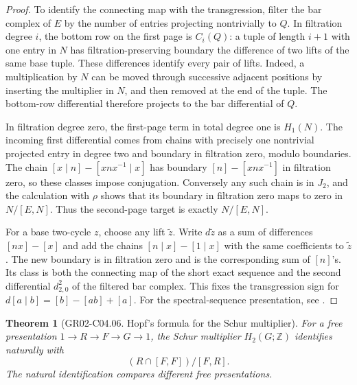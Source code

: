 \documentclass[11pt,oneside,openany]{book}
\newtheorem{theorem}{Theorem}[chapter]
\theoremstyle{definition}
\theoremstyle{remark}
\begin{document}
\begin{proof}
To identify the connecting map with the transgression, filter the
bar complex of \(E\) by the number of entries projecting
nontrivially to \(Q\). In filtration degree \(i\), the bottom row
on the first page is \(C_i(Q)\): a tuple of length \(i+1\) with
one entry in \(N\) has filtration-preserving boundary the
difference of two lifts of the same base tuple. These differences
identify every pair of lifts. Indeed, a multiplication by \(N\)
can be moved through successive adjacent positions by inserting
the multiplier in \(N\), and then removed at the end of the
tuple. The bottom-row differential therefore projects to the bar
differential of \(Q\).

In filtration degree zero, the first-page term in total degree one
is \(H_1(N)\). The incoming first differential comes from
chains with precisely one nontrivial projected entry in degree
two and boundary in filtration zero, modulo boundaries.
The chain \([x\mid n]-[xnx^{-1}\mid x]\) has boundary
\([n]-[xnx^{-1}]\) in filtration zero, so these classes impose
conjugation. Conversely any such chain is in \(J_2\), and the
calculation with \(\rho\) shows that its boundary in filtration
zero maps to zero in \(N/[E,N]\). Thus the second-page target
is exactly \(N/[E,N]\).

For a base two-cycle \(z\), choose any lift \(\widetilde z\).
Write \(d\widetilde z\) as a sum of differences \([nx]-[x]\) and
add the chains \([n\mid x]-[1\mid x]\) with the same coefficients
to \(\widetilde z\). The new boundary is in filtration zero and
is the corresponding sum of \([n]\)'s. Its class is both the
connecting map of the short exact sequence and the second
differential \(d^2_{2,0}\) of the filtered bar complex. This fixes
the transgression sign for \(d[a\mid b]=[b]-[ab]+[a]\).
For the spectral-sequence presentation, see \cite[Section 6.8.3]{weibel}.
\end{proof}

\begin{theorem}[GR02-C04.06. Hopf's formula for the Schur multiplier]
\label{thm:gr02-hopf-formula}
For a free presentation \(1\to R\to F\to G\to 1\), the Schur
multiplier \(H_2(G;\mathbb Z)\) identifies naturally with
\[
       (R\cap[F,F])/[F,R].
\]
The natural identification compares different free presentations.
\end{theorem}
\end{document}
